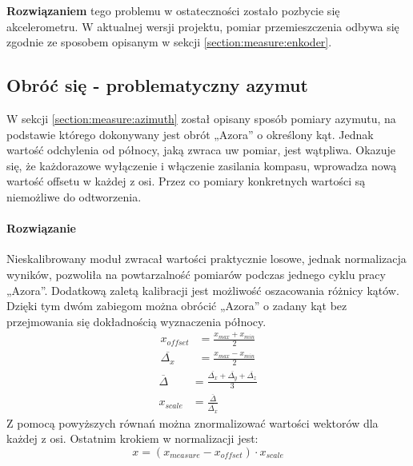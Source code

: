         \textbf{Rozwiązaniem} tego problemu w ostateczności zostało pozbycie się akcelerometru.
        W aktualnej wersji projektu, pomiar przemieszczenia odbywa się zgodnie ze sposobem opisanym w sekcji \ref{section:measure:enkoder}.


    \subsection{Obróć się - problematyczny azymut}
        W sekcji \ref{section:measure:azimuth} został opisany sposób pomiary azymutu, na podstawie którego dokonywany jest obrót „Azora” o określony kąt.
        Jednak wartość odchylenia od północy, jaką zwraca uw pomiar, jest wątpliwa.
        Okazuje się, że każdorazowe wyłączenie i włączenie zasilania kompasu, wprowadza nową wartość offsetu w każdej z osi.
        Przez co pomiary konkretnych wartości są niemożliwe do odtworzenia. 

        \paragraph{Rozwiązanie\\}
        Nieskalibrowany moduł zwracał wartości praktycznie losowe, jednak normalizacja wyników, pozwoliła na powtarzalność pomiarów podczas jednego cyklu pracy „Azora”.
        Dodatkową zaletą kalibracji jest możliwość oszacowania różnicy kątów.
        Dzięki tym dwóm zabiegom można obrócić „Azora” o zadany kąt bez przejmowania się dokładnością wyznaczenia północy.
        \begin{align}
            x_{offset} &= \frac{x_{max} + x_{min}}{2}\\
            \overline{\Delta_x} &=  \frac{x_{max} - x_{min}}{2}
        \end{align}
        \begin{align}
            \overline{\Delta} &= \frac{\overline{\Delta_x} + \overline{\Delta_y} + \overline{\Delta_z}}{3}\\
            x_{scale} &= \frac{\overline{\Delta}}{\overline{\Delta_x}}
        \end{align}
        Z pomocą powyższych równań można znormalizować wartości wektorów dla każdej z osi. Ostatnim krokiem w normalizacji jest:
        \begin{equation}
            x = (x_{measure} - x_{offset}) \cdot x_{scale}
        \end{equation}

